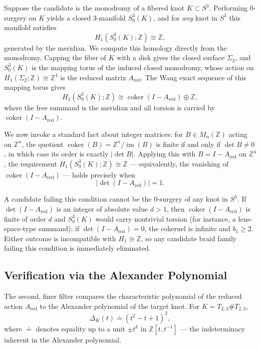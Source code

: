 Suppose the candidate is the monodromy of a fibered knot $K \subset S^3$. Performing $0$-surgery on $K$ yields a closed $3$-manifold $S^3_0(K)$, and for \emph{any} knot in $S^3$ this manifold satisfies
\[
H_1(S^3_0(K); \mathbb{Z}) \cong \mathbb{Z},
\]
generated by the meridian. We compute this homology directly from the monodromy. Capping the fiber of $K$ with a disk gives the closed surface $\Sigma_2$, and $S^3_0(K)$ is the mapping torus of the induced closed monodromy, whose action on $H_1(\Sigma_2; \mathbb{Z}) \cong \mathbb{Z}^4$ is the reduced matrix $A_{\text{red}}$. The Wang exact sequence of this mapping torus gives
\[
H_1(S^3_0(K); \mathbb{Z}) \cong \operatorname{coker}(I - A_{\text{red}}) \oplus \mathbb{Z},
\]
where the free summand is the meridian and all torsion is carried by $\operatorname{coker}(I - A_{\text{red}})$.

We now invoke a standard fact about integer matrices: for $B \in M_n(\mathbb{Z})$ acting on $\mathbb{Z}^n$, the quotient $\operatorname{coker}(B) = \mathbb{Z}^n / \operatorname{im}(B)$ is finite if and only if $\det B \neq 0$, in which case its order is exactly $|\det B|$. Applying this with $B = I - A_{\text{red}}$ on $\mathbb{Z}^4$, the requirement $H_1(S^3_0(K); \mathbb{Z}) \cong \mathbb{Z}$ --- equivalently, the vanishing of $\operatorname{coker}(I - A_{\text{red}})$ --- holds precisely when
\begin{equation}\label{eq:homology_check_det_equal_1}
    |\det(I - A_{\text{red}})| = 1.
\end{equation}

A candidate failing this condition cannot be the $0$-surgery of any knot in $S^3$. If $\det(I - A_{\text{red}})$ is an integer of absolute value $d > 1$, then $\operatorname{coker}(I - A_{\text{red}})$ is finite of order $d$ and $S^3_0(K)$ would carry nontrivial torsion (for instance, a lens-space-type summand); if $\det(I - A_{\text{red}}) = 0$, the cokernel is infinite and $b_1 \geq 2$. Either outcome is incompatible with $H_1 \cong \mathbb{Z}$, so any candidate braid family failing this condition is immediately eliminated.

\subsection{Verification via the Alexander Polynomial}
\label{subsec:alexander_poly_check}

The second, finer filter compares the characteristic polynomial of the reduced action $A_{\text{red}}$ to the Alexander polynomial of the target knot. For $K = T_{2,3} \# T_{2,3}$,
\[
\Delta_K(t) \doteq (t^2 - t + 1)^2,
\]
where $\doteq$ denotes equality up to a unit $\pm t^k$ in $\mathbb{Z}[t, t^{-1}]$ --- the indeterminacy inherent in the Alexander polynomial.

